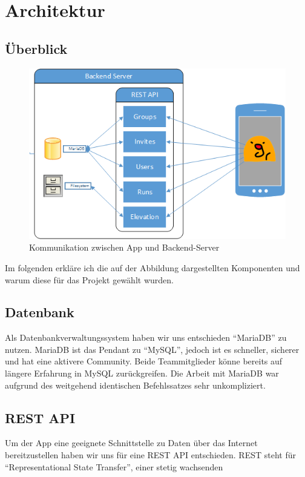 \section{Architektur}\label{kapitel2}
\subsection{Überblick}
\begin {figure}[htb]
\centering
\includegraphics{abb/network_diagram_visio}
\caption{Kommunikation zwischen App und Backend-Server}
\end{figure}
Im folgenden erkläre ich die auf der Abbildung dargestellten Komponenten und warum diese für das Projekt gewählt wurden.
\subsection{Datenbank}
Als Datenbankverwaltungssystem  haben wir uns entschieden ``MariaDB'' zu nutzen. MariaDB ist das Pendant zu ``MySQL'', jedoch ist es schneller, sicherer und hat eine aktivere Community.
Beide Teammitglieder könne bereits auf längere Erfahrung in MySQL zurückgreifen. Die Arbeit mit MariaDB war aufgrund des weitgehend identischen Befehlssatzes sehr unkompliziert.
\subsection{REST API}
Um der App eine geeignete Schnittstelle zu Daten über das Internet bereitzustellen haben wir uns für eine REST API entschieden.
REST steht für ``Representational State Transfer'', einer stetig wachsenden 